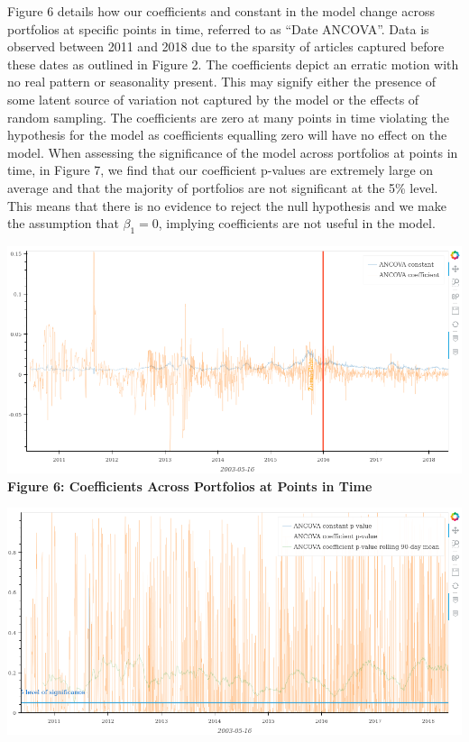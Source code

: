 \documentclass[11pt]{article}
\makeatletter
\def\maxwidth{\ifdim\Gin@nat@width>\linewidth\linewidth
    \else\Gin@nat@width\fi}
\let\Oldincludegraphics\includegraphics
\renewcommand{\includegraphics}[1]{\Oldincludegraphics[width=.8\maxwidth]{#1}}
\makeatother
\begin{document}
Figure 6 details how our coefficients and constant in the model change
across portfolios at specific points in time, referred to as ``Date
ANCOVA''. Data is observed between 2011 and 2018 due to the sparsity of
articles captured before these dates as outlined in Figure 2. The
coefficients depict an erratic motion with no real pattern or
seasonality present. This may signify either the presence of some latent
source of variation not captured by the model or the effects of random
sampling. The coefficients are zero at many points in time violating the
hypothesis for the model as coefficients equalling zero will have no
effect on the model. When assessing the significance of the model across
portfolios at points in time, in Figure 7, we find that our coefficient
p-values are extremely large on average and that the majority of
portfolios are not significant at the 5\% level. This means that there
is no evidence to reject the null hypothesis and we make the assumption
that \(\beta_{1}=0\), implying coefficients are not useful in the model.

\includegraphics{../experiments/media/Coefficients with constant over time.png}\\

\textbf{Figure 6: Coefficients Across Portfolios at Points in Time}

\includegraphics{../experiments/media/P-Values with constant over time.png}\\
\end{document}
